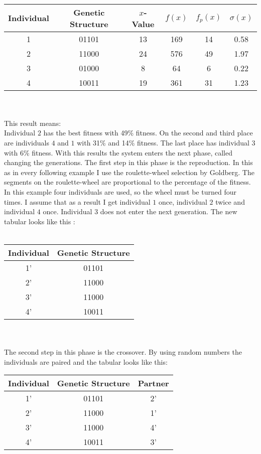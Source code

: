 \\
\begin{tabular}{c|c|c|c|c|c}
Individual & Genetic Structure & $x$-Value & $f(x)$ & $f_p (x)$ & $\sigma(x)$ \\ \hline
 1 & 01101 & 13 & 169 & 14 & 0.58\\
 2 & 11000 & 24 & 576 & 49 & 1.97\\
 3 & 01000 & 8  & 64  & 6  & 0.22\\
 4 & 10011 & 19 & 361 & 31 & 1.23\\
\end{tabular}
\\
\\
This result means:\\
Individual $2$ has the best fitness with 49\% fitness. On the second and third 
place are individuals $4$ and $1$ with 31\% and 14\% fitness. The last place
has individual $3$ with 6\% fitness.
With this results the system enters the next phase, called changing the generations.
The first step in this phase is the reproduction. In this as in every following example
I use the roulette-wheel selection by Goldberg\cite{Gol89}. The segments on the
roulette-wheel are proportional to the percentage of the fitness. In this example
four individuals are used, so the wheel must be turned four times. I assume that
as a result I get individual $1$ once, individual $2$ twice and individual $4$
once. Individual $3$ does not enter the next generation. The new tabular looks
like this :\\
\\
\begin{tabular}{c|c}
Individual & Genetic Structure \\ \hline
 1' & 01101 \\
 2' & 11000 \\
 3' & 11000 \\
 4' & 10011 \\
\end{tabular}
\\
\\
The second step in this phase is the crossover. By using random numbers the
individuals are paired and the tabular looks like this:\\
\begin{tabular}{c|c|c}
Individual & Genetic Structure & Partner\\ \hline
 1' & 01101 & 2'\\
 2' & 11000 & 1'\\
 3' & 11000 & 4'\\
 4' & 10011 & 3'\\
\end{tabular}
